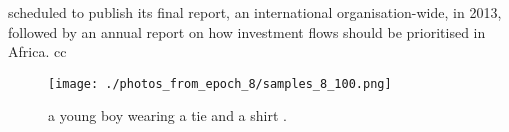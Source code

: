 \documentclass{article}%
\begin{document}
scheduled to publish its final report, an international organisation{-}wide, in 2013, followed by an annual report on how investment flows should be prioritised in Africa.\newline%
cc\newline%

%


\begin{figure}[h!]%
\centering%
\texttt{[image: ./photos\_from\_epoch\_8/samples\_8\_100.png]}%
\caption{a young boy wearing a tie and a shirt .}%
\end{figure}

%
\end{document}
